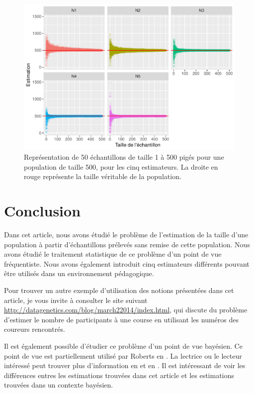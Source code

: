 \documentclass[10pt]{article}
\begin{document}
\begin{figure}[!htb]

{\centering \includegraphics[width=0.9\linewidth]{serial_number_amq_files/figure-latex/pop-1-500-1} 

}

\caption{Représentation de 50 échantillons de taille 1 à 500 pigés pour une population de taille 500, pour les cinq estimateurs. La droite en rouge représente la taille véritable de la population.}\label{fig:pop-1-500}
\end{figure}

\hypertarget{conclusion}{%
\section{\texorpdfstring{Conclusion
\label{conclusion}}{Conclusion }}\label{conclusion}}

Dans cet article, nous avons étudié le problème de l'estimation de la
taille d'une population à partir d'échantillons prélevés sans remise de
cette population. Nous avons étudié le traitement statistique de ce
problème d'un point de vue fréquentiste. Nous avons également introduit
cinq estimateurs différents pouvant être utilisés dans un environnement
pédagogique.

Pour trouver un autre exemple d'utilisation des notions présentées dans
cet article, je vous invite à consulter le site suivant
\url{http://datagenetics.com/blog/march22014/index.html}, qui discute du
problème d'estimer le nombre de participants à une course en utilisant
les numéros des coureurs rencontrés.

Il est également possible d'étudier ce problème d'un point de vue
bayésien. Ce point de vue est partiellement utilisé par Roberts en
\cite{Roberts1967}. La lectrice ou le lecteur intéressé peut trouver
plus d'information en \cite{Hohle2006} et en \cite{WikiGermanTank}. Il
est intéressant de voir les différences entres les estimations trouvées
dans cet article et les estimations trouvées dans un contexte bayésien.
\end{document}

